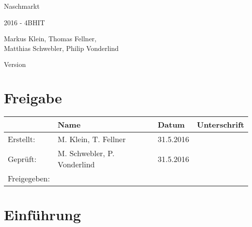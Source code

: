 \documentclass[12pt, letterpaper]{report}
\begin{document}
	\begin{titlepage}
		\begin{center}
			\vspace*{1cm}

			{\fontsize{25}{25} Naschmarkt\\}
            \vspace{0.3cm}
            {\fontsize{25}{25}}

			\vspace{2.5cm}

			2016 - 4BHIT

			\vspace*{5mm}

			\small{Markus Klein, Thomas Fellner,\\Matthias Schwebler, Philip Vonderlind}

			\vspace*{2cm}

			Version \version

			\vfill

			\chapter*{Freigabe}
			\begin{center}
				\begin{tabu} to 
					\hline
					& Name & Datum & Unterschrift \\ \hline
					Erstellt: & M. Klein, T. Fellner & 31.5.2016 & \\ \hline
					Gepr\"uft: & M. Schwebler, P. Vonderlind & 31.5.2016 & \\ \hline
					Freigegeben: &  &  & \\
					\hline
				\end{tabu}
			\end{center}

		\end{center}
	\end{titlepage}


	\newpage
	\tableofcontents


	\newpage
	\chapter*{Einf\"uhrung}
\end{document}
